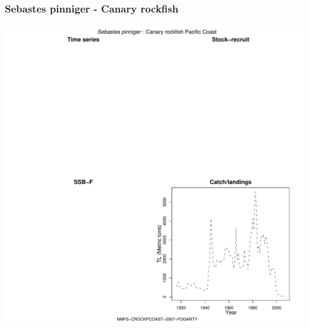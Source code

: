 \subsubsection{Sebastes pinniger - Canary rockfish}
\begin{center}
\includegraphics[width=1.2\textwidth]{../R/figures/NMFS-CROCKPCOAST-2007-FOGARTY.pdf}
\end{center}

